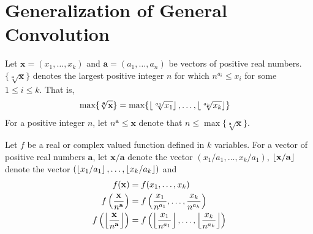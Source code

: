 \documentclass[elemannt.tex]{subfile}
\begin{document}
	\section{Generalization of General Convolution}
	Let $\mathbf{x}=(x_{1},\ldots,x_{k})$ and $\mathbf{a}=(a_{1},\ldots,a_{n})$ be vectors of positive real numbers. $\{\sqrt[\mathbf{a}]{\mathbf{x}}\}$ denotes the largest positive integer $n$ for which $n^{a_{i}}\leq x_{i}$ for some $1\leq i\leq k$. That is,
		\begin{align*}
			\max\{\sqrt[\mathbf{a}]{\mathbf{x}}\}
				& = \max\{\left\lfloor{\sqrt[a_{1}]{x_{1}}}\right\rfloor,\ldots,\left\lfloor{\sqrt[a_{k}]{x_{k}}}\right\rfloor\}
		\end{align*}
	For a positive integer $n$, let $n^{\mathbf{a}}\leq\mathbf{x}$ denote that $n\leq\max\{\sqrt[\mathbf{a}]{\mathbf{x}}\}$. 
	
	Let $f$ be a real or complex valued function defined in $k$ variables. For a vector of positive real numbers $\mathbf{a}$, let $\mathbf{x}/\mathbf{a}$ denote the vector $(x_{1}/a_{1},\ldots,x_{k}/a_{1})$, $\left\lfloor{\mathbf{x}/\mathbf{a}}\right\rfloor$ denote the vector $(\left\lfloor{x_{1}/a_{1}}\right\rfloor,\ldots,\left\lfloor{x_{k}/a_{k}}\right\rfloor)$ and
		\begin{align*}
			f(\mathbf{x})
				& = f(x_{1},\ldots,x_{k})\\
			f\left(\dfrac{\mathbf{x}}{n^{\mathbf{a}}}\right)
				& = f\left(\dfrac{x_{1}}{n^{a_{1}}},\ldots,\dfrac{x_{k}}{n^{a_{k}}}\right)\\
			f\left(\left\lfloor\dfrac{\mathbf{x}}{n^{\mathbf{a}}}\right\rfloor\right)
				& = f\left(\left\lfloor{\dfrac{x_{1}}{n^{a_{1}}}}\right\rfloor,\ldots,\left\lfloor{\dfrac{x_{k}}{n^{a_{k}}}}\right\rfloor\right)
		\end{align*}
	
\end{document}
